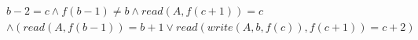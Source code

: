 \begin{align*}
%
& %
b - 2 = c
%
\land
%
f(b - 1)  \neq  b
%
\land
%
\mathit{read}(A,f(c + 1)) = c
~\\~
& %
%
\land
%
(\mathit{read}(A,f(b - 1)) = b + 1 \lor \mathit{read}(\mathit{write}(A,b,f(c)),f(c + 1)) = c + 2)
%
\end{align*}
